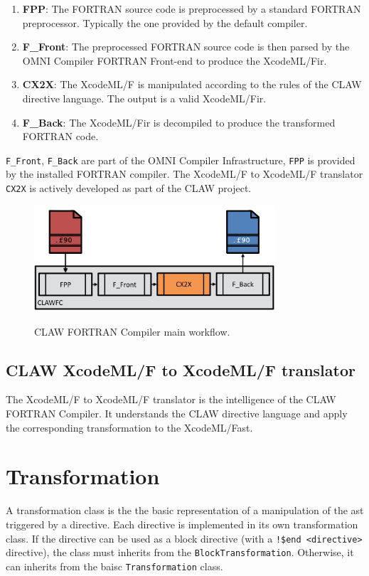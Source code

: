 \documentclass[a4paper, 11pt]{report}
\def\clawfcomp{CLAW FORTRAN Compiler\xspace}
\def\omni{OMNI Compiler Infrastructure\xspace}
\def\xcodeml{XcodeML/F\xspace}
\def\ffront{\lstinline!F_Front!\xspace}
\def\fback{\lstinline!F_Back!\xspace}
\def\fpp{\lstinline!FPP!\xspace}
\def\cx2x{\lstinline!CX2X!\xspace}
\begin{document}
\begin{enumerate}
\item \textbf{FPP}: The FORTRAN source code is preprocessed by a standard FORTRAN preprocessor. Typically the one provided by the default compiler. 
\item \textbf{F\_Front}: The preprocessed FORTRAN source code is then parsed by the OMNI Compiler FORTRAN Front-end to produce the \xcodeml \gls{ir}.
\item \textbf{CX2X}: The \xcodeml is manipulated according to the rules of the CLAW directive language. The output is a valid \xcodeml \gls{ir}.
\item \textbf{F\_Back}: The \xcodeml \gls{ir} is decompiled to produce the transformed FORTRAN code. 
\end{enumerate}

\ffront{}, \fback{} are part of the \omni{}, \fpp{} is provided by the installed FORTRAN compiler. The \xcodeml to \xcodeml translator \cx2x{} is actively developed as part of the CLAW project.  

\begin{figure}[!ht]
  \centering
  \includegraphics[width=0.8\textwidth]{resources/clawfc_global_workflow.png} \\
  \caption{CLAW FORTRAN Compiler main workflow.}
  \label{fig:clawfc_main_workflow}
\end{figure}

\section{CLAW \xcodeml to \xcodeml translator}
The \xcodeml to \xcodeml translator is the intelligence of the \clawfcomp. It understands the CLAW directive language and apply the corresponding transformation to the \xcodeml \gls{ast}.


\chapter{Transformation}
A transformation class is the the basic representation of a manipulation of the \gls{ast} triggered by a directive. Each directive is implemented in its own transformation class. If the directive can be used as a block directive (with a \lstinline|!$end <directive>| directive), the class must inherits from the \lstinline!BlockTransformation!. Otherwise, it can inherits from the baisc \lstinline!Transformation! class.
\end{document}
